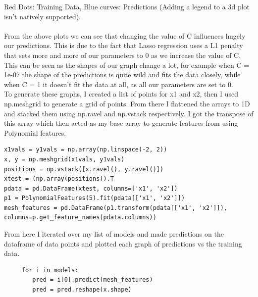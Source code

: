 \documentclass[11pt]{article} %
\begin{document}
\begin{figure}[h]
\qquad
{}
\qquad
{}
\end{figure}
 Red Dots: Training Data, Blue curves: Predictions (Adding a legend to a 3d plot isn't natively supported).\\\\
 From the above plots we can see that changing the value of C influences hugely our predictions. This is due to the fact that Lasso regression uses a L1 penalty that sets more and more of our parameters to 0 as we increase the value of C. This can be seen as the shapes of our graph change a lot, for example when C = 1e-07 the shape of the predictions is quite wild and fits the data closely, while when C = 1 it doesn't fit the data at all, as all our parameters are set to 0.
 \\
 To generate these graphs, I created a list of points for x1 and x2, then I used np.meshgrid to generate a grid of points. From there I flattened the arrays to 1D and stacked them using np.ravel and np.vstack respectively. I got the transpose of this array which then acted as my base array to generate features from using Polynomial features.
 \begin{verbatim}
x1vals = y1vals = np.array(np.linspace(-2, 2))
x, y = np.meshgrid(x1vals, y1vals)
positions = np.vstack([x.ravel(), y.ravel()])
xtest = (np.array(positions)).T
pdata = pd.DataFrame(xtest, columns=['x1', 'x2'])
p1 = PolynomialFeatures(5).fit(pdata[['x1', 'x2']])
mesh_features = pd.DataFrame(p1.transform(pdata[['x1', 'x2']]), columns=p.get_feature_names(pdata.columns))
 \end{verbatim}
 From here I iterated over my list of models and made predictions on the dataframe of data points and plotted each graph of predictions vs the training data.
 \begin{verbatim}
     for i in models:
        pred = i[0].predict(mesh_features)
        pred = pred.reshape(x.shape)
 \end{verbatim}
\end{document}
